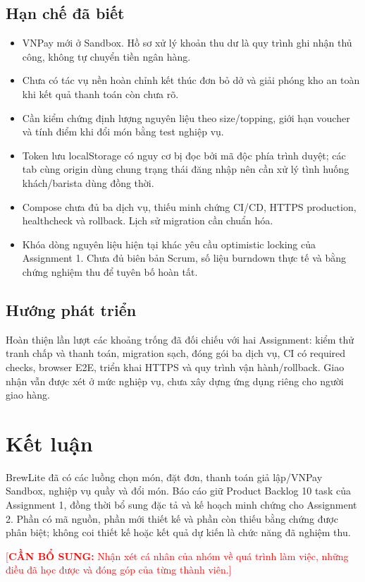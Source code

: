 \documentclass[a4paper]{article}
\newcommand{\chen}[1]{\textcolor{red}{[\textbf{CẦN BỔ SUNG:} #1]}}
\begin{document}
\subsection{Hạn chế đã biết}
\begin{itemize}
\item VNPay mới ở Sandbox. Hồ sơ xử lý khoản thu dư là quy trình ghi nhận thủ công, không tự chuyển tiền ngân hàng.
\item Chưa có tác vụ nền hoàn chỉnh kết thúc đơn bỏ dở và giải phóng kho an toàn khi kết quả thanh toán còn chưa rõ.
\item Cần kiểm chứng định lượng nguyên liệu theo size/topping, giới hạn voucher và tính điểm khi đổi món bằng test nghiệp vụ.
\item Token lưu localStorage có nguy cơ bị đọc bởi mã độc phía trình duyệt; các tab cùng origin dùng chung trạng thái đăng nhập nên cần xử lý tình huống khách/barista dùng đồng thời.
\item Compose chưa đủ ba dịch vụ, thiếu minh chứng CI/CD, HTTPS production, healthcheck và rollback. Lịch sử migration cần chuẩn hóa.
\item Khóa dòng nguyên liệu hiện tại khác yêu cầu optimistic locking của Assignment 1. Chưa đủ biên bản Scrum, số liệu burndown thực tế và bằng chứng nghiệm thu để tuyên bố hoàn tất.
\end{itemize}
\subsection{Hướng phát triển}
Hoàn thiện lần lượt các khoảng trống đã đối chiếu với hai Assignment: kiểm thử tranh chấp và thanh toán, migration sạch, đóng gói ba dịch vụ, CI có required checks, browser E2E, triển khai HTTPS và quy trình vận hành/rollback. Giao nhận vẫn được xét ở mức nghiệp vụ, chưa xây dựng ứng dụng riêng cho người giao hàng.

\section{Kết luận}
BrewLite đã có các luồng chọn món, đặt đơn, thanh toán giả lập/VNPay Sandbox, nghiệp vụ quầy và đổi món. Báo cáo giữ Product Backlog 10 task của Assignment 1, đồng thời bổ sung đặc tả và kế hoạch minh chứng cho Assignment 2. Phần có mã nguồn, phần mới thiết kế và phần còn thiếu bằng chứng được phân biệt; không coi thiết kế hoặc kết quả dự kiến là chức năng đã nghiệm thu.



\chen{Nhận xét cá nhân của nhóm về quá trình làm việc, những điều đã học được và đóng góp của từng thành viên.}
\end{document}

